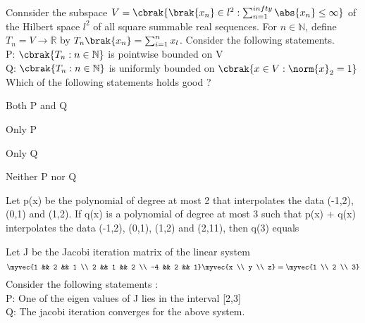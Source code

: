 \iffalse
\title{GATE Questions 12}
\author{EE24BTECH11012 - Bhavanisankar G S}
\section{ma}
\chapter{2017}
\fi
	\item Connsider the subspace $V = \cbrak{ \brak{x_n} \in l^2 : \sum_{n=1}^{infty} \abs{x_n} \leq \infty}$ of the Hilbert space $l^2$ of all square summable real sequences. For $n \in \mathbb{N}$, define $T_n = V \to \mathbb{R} $ by $T_n\brak{x_n} = \sum_{i=1}^{n} x_l $. Consider the following statements. \\
		P: $\cbrak{T_n : n \in \mathbb{N}}$ is pointwise bounded on V \\
		Q: $\cbrak{T_n : n \in \mathbb{N}}$ is uniformly bounded on $\cbrak{x \in V : \norm{x}_2 = 1}$ \\
	Which of the following statements holds good ?
		\begin{enumerate}
		\end{enumerate}
	\item Let p(x) be the polynomial of degree at most 2 that interpolates the data (-1,2), (0,1) and (1,2). If q(x) is a polynomial of degree at most 3 such that p(x) + q(x) interpolates the data (-1,2), (0,1), (1,2) and (2,11), then q(3) equals
	\item Let J be the Jacobi iteration matrix of the linear system 
		$$ \myvec{1 && 2 && 1 \\ 2 && 1 && 2 \\ -4 && 2 && 1} \myvec{x \\ y \\ z} = \myvec{1 \\ 2 \\ 3} $$
		Consider the following statements : \\
		P: One of the eigen values of J lies in the interval [2,3] \\
		Q: The jacobi iteration converges for the above system. \\
